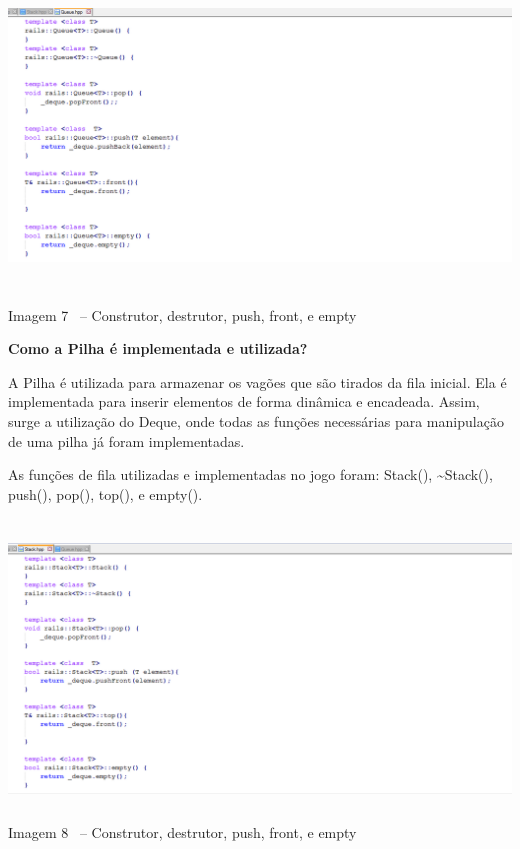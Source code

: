 \documentclass[a4paper]{article}
\begin{document}
\bigskip


\includegraphics[width=6.2709in,height=3.1665in]{Tra1n-img/Tra1n-img8.png}


{\centering\color{black}
Imagem 7 \ – Construtor, destrutor, push, front, e empty
\par}


\bigskip


\bigskip


\bigskip

{\color{black}
\textbf{\textcolor[rgb]{0.13333334,0.13333334,0.13333334}{Como a Pilha é
implementada e utilizada?}}}


\bigskip

{\color{black}
\textcolor[rgb]{0.13333334,0.13333334,0.13333334}{A Pilha é utilizada
para armazenar os vagões que são tirados da fila inicial. Ela é
implementada para inserir elementos de forma dinâmica e encadeada.
Assim, surge a utilização do Deque, onde todas as funções necessárias
para manipulação de uma pilha já foram
implementadas.}\textcolor[rgb]{0.13333334,0.13333334,0.13333334}{ \ }}

{\color{black}
\textcolor[rgb]{0.13333334,0.13333334,0.13333334}{As funções de fila
utilizadas e implementadas no jogo foram: Stack(), \~{}Stack(), push(),
pop(), top(), e empty().}}


\bigskip

{\centering\color{black}

\includegraphics[width=6.2709in,height=3.1252in]{Tra1n-img/Tra1n-img9.png}
Imagem 8 \ – Construtor, destrutor, push, front, e empty
\par}
\end{document}
